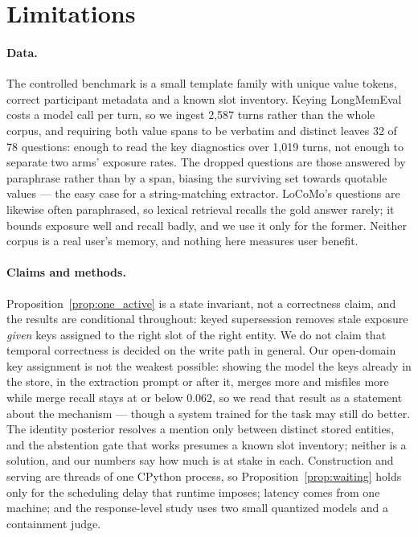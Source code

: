 \documentclass{article} %
\begin{document}
\section{Limitations}

\paragraph{Data.} The controlled benchmark is a small template family with unique value tokens, correct participant metadata and a known slot inventory. Keying LongMemEval costs a model call per turn, so we ingest 2{,}587 turns rather than the whole corpus, and requiring both value spans to be verbatim and distinct leaves 32 of 78 questions: enough to read the key diagnostics over 1{,}019 turns, not enough to separate two arms' exposure rates. The dropped questions are those answered by paraphrase rather than by a span, biasing the surviving set towards quotable values --- the easy case for a string-matching extractor. LoCoMo's questions are likewise often paraphrased, so lexical retrieval recalls the gold answer rarely; it bounds exposure well and recall badly, and we use it only for the former. Neither corpus is a real user's memory, and nothing here measures user benefit.

\paragraph{Claims and methods.} Proposition~\ref{prop:one_active} is a state invariant, not a correctness claim, and the results are conditional throughout: keyed supersession removes stale exposure \emph{given} keys assigned to the right slot of the right entity. We do not claim that temporal correctness is decided on the write path in general. Our open-domain key assignment is not the weakest possible: showing the model the keys already in the store, in the extraction prompt or after it, merges more and misfiles more while merge recall stays at or below 0.062, so we read that result as a statement about the mechanism --- though a system trained for the task may still do better. The identity posterior resolves a mention only between distinct stored entities, and the abstention gate that works presumes a known slot inventory; neither is a solution, and our numbers say how much is at stake in each. Construction and serving are threads of one CPython process, so Proposition~\ref{prop:waiting} holds only for the scheduling delay that runtime imposes; latency comes from one machine; and the response-level study uses two small quantized models and a containment judge.
\end{document}
